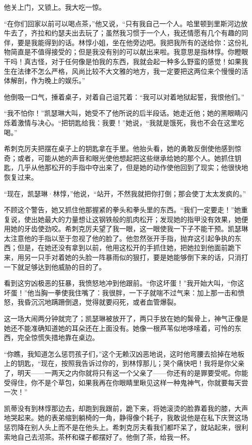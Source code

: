 \par 他关上门，又锁上。我大吃一惊。
\par “在你们回家以前可以喝点茶，”他又说，“只有我自己一个人。哈里顿到里斯河边放牛去了，齐拉和约瑟夫出去玩了；虽然我习惯于一个人，我还情愿有几个有趣的同伴，要是我能得到的话。林惇小姐，坐在他旁边吧。我把我所有的送给你：这份礼物简直是不值得接受的；但是我没有别的可以献出来啦。我意思是指林惇。你瞪眼干吗！真古怪，对于任何像是怕我的东西，我就会起一种多么野蛮的感觉！如果我生在法律不怎么严格，风尚比较不大文雅的地方，我一定要把这两位来个慢慢的活体解剖，作为晚上的娱乐。”
\par 他倒吸一口气，捶着桌子，对着自己诅咒着：“我可以对着地狱起誓，我恨他们。”
\par “我不怕你！”凯瑟琳大叫，她受不了他所说的后半段话。她走近他；她的黑眼睛闪烁着激情与决心。“把钥匙给我：我要！”她说，“我就是饿死，我也不会在这里吃喝。”
\par 希刺克厉夫把摆在桌子上的钥匙拿在手里。他抬头看，她的勇敢反倒使他感到惊奇；或者，可能从她的声音和眼光使他想起把这些继承给她的那个人。她抓住钥匙，几乎从他那松开的手指中夺出来了，但是她的动作使他回到了现实；他很快地恢复过来。
\par “现在，凯瑟琳·林惇，”他说，“站开，不然我就把你打倒；那会使丁太太发疯的。”
\par 不顾这个警告，她又抓住他那握紧的拳头和拳头里的东西。“我们一定要走！”她重复说，使出她最大的力量想让这钢铁般的肌肉松开；发现她的指甲没有效果，她便用她的牙齿使劲咬。希刺克厉夫望了我一眼，这一眼使我一下子不能干预。凯瑟琳太注意他的手指以至于忽视了他的脸了。他忽然张开手指，抛弃这引起争执的东西；但是，在她还没有拿到以前，他用这松开的手抓住她，把她拉到他面前跪下来，用另一只手对着她的头脸一阵暴雨似的狠打，要是她能够倒下来的话，只消打一下就足够达到他威胁的目的了。
\par 看到这穷凶极恶的狂暴，我愤怒地冲到他跟前。“你这坏蛋！”我开始大叫，“你这坏蛋！”他当胸一拳使我住嘴了：我很胖，一下子就喘不过气来：加上那一击和愤怒，我昏沉沉地蹒跚倒退，觉得就要闷死，或者血管爆裂。
\par 这一场大闹两分钟就完了；凯瑟琳被放开了，两只手放在她的鬓骨上，神气正像是她还不能准确知道她的耳朵还在上面没有。她像一根芦苇似地哆嗦着，可怜的东西，完全惊慌失措地靠在桌边。
\par “你瞧，我知道怎么惩罚孩子们，”这个无赖汉凶恶地说，这时他弯腰去拾掉在地板上的钥匙，“现在，按照我告诉过你的，到林惇那儿；哭个痛快吧！我将是你父亲了，明天——一两天之内你就将只有这一个父亲了——你还有的是罪要受呢。你能受得住，你不是个草包，如果我再在你眼睛里瞅见这样一种鬼神气，你就要每天尝一次！”
\par 凯蒂没有到林惇那边去，却跑到我跟前，跪下来，将她滚烫的脸靠着我的膝，大声地哭起来。她的表弟缩到躺椅的一角，静得像个耗子，我敢说他是在私下庆贺这场惩罚降在别人头上而不是在他头上。希刺克厉夫看我们都吓呆了，就站起来，很利索地自己去沏茶。茶杯和碟子都摆好了。他倒了茶，给我一杯。
